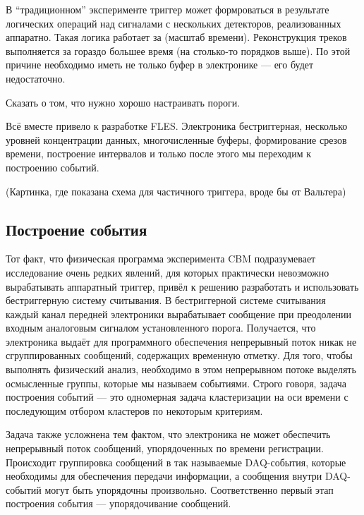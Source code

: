 В ``традиционном'' эксперименте триггер может формроваться в результате логических операций над сигналами с нескольких детекторов, реализованных аппаратно. Такая логика работает за (масштаб времени). Реконструкция треков выполняется за гораздо большее время (на столько-то порядков выше). По этой причине необходимо иметь не только буфер в электронике --- его будет недостаточно. 

Сказать о том, что нужно хорошо настраивать пороги.

Всё вместе привело к разработке FLES. Электроника бестриггерная, несколько уровней концентрации данных, многочисленные буферы, формирование срезов времени, построение интервалов и только после этого мы переходим к построению событий.

(Картинка, где показана схема для частичного триггера, вроде бы от Вальтера)

\subsection{Построение события}\label{sec:secEventBuilding}

Тот факт, что физическая программа эксперимента CBM подразумевает исследование очень редких явлений, для которых практически невозможно вырабатывать аппаратный триггер, привёл к решению разработать и использовать бестриггерную систему считывания. В бестриггерной системе считывания каждый канал передней электроники вырабатывает сообщение при преодолении входным аналоговым сигналом установленного порога. Получается, что электроника выдаёт для программного обеспечения непрерывный поток никак не сгруппированных сообщений, содержащих временную отметку. Для того, чтобы выполнять физический анализ, необходимо в этом непрерывном потоке выделять осмысленные группы, которые мы называем событиями. Строго говоря, задача построения событий --- это одномерная задача кластеризации на оси времени с последующим отбором кластеров по некоторым критериям.

Задача также усложнена тем фактом, что электроника не может обеспечить непрерывный поток сообщений, упорядоченных по времени регистрации. Происходит группировка сообщений в так называемые DAQ-события, которые необходимы для обеспечения передачи информации, а сообщения внутри DAQ-событий могут быть упорядочны произвольно. Соответственно первый этап построения события --- упорядочивание сообщений.

